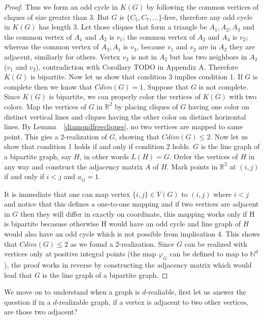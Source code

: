 \documentclass[12pt,a4paper,titlepage,openany]{report}
\begin{document}
\begin{proof}
Thus we form an odd cycle in $K(G)$ by following the common vertices of cliques of size greater than $3$. But $G$ is $\{C_5,C_7,\ldots\}$-free, therefore any odd cycle in $K(G)$ has length $3$. Let those cliques that form a triangle be $A_1,A_2,A_3$ and the common vertex of $A_1$ and $A_2$ is $v_1$; the common vertex of $A_2$ and $A_3$ is $v_2$; whereas the common vertex of $A_3,A_1$ is $v_3$, because $v_1$ and $v_2$ are in $A_2$ they are adjacent, similiarly for others. Vertex $v_3$ is not in $A_2$ but has two neighbors in $A_2$ ($v_1$ and $v_2$), contradiction with Corollary TODO in Appendix A. Therefore $K(G)$ is bipartite.\newline \medskip 
Now let us show that condition 3 implies condition 1. If $G$ is complete then we know that $Cdim(G)=1$. Suppose that $G$ is not complete. Since $K(G)$ is bipartite, we can properly color the vertices of $K(G)$ with two colors. Map the vertices of $G$ in $\mathbb{R}^2$ by placing cliques of $G$ having one color on distinct vertical lines and cliques having the other color on distinct horizontal lines. By Lemma~~\ref{diamondfreecliques}, no two vertices are mapped to same point. This gies a 2-realization of $G$, showing that $Cdim(G)\leq 2$.
\newline
Now let us show that condition 1 holds if and only if condition 2 holds. $G$ is the line graph of a bipartite graph, say $H$, in other words $L(H)=G$. Order the vertices of $H$ in any way and construct the adjacency matrix $A$ of $H$. Mark points in $\mathbb{R}^2$ at $(i, j)$ if and only if $i<j$ and $a_{ij} = 1$. 

It is immediate that one can map vertex $\{i,j\}\in V(G)$ to $(i,j)$ where $i<j$ and notice that this defines a one-to-one mapping and if two vertices are adjacent in $G$ then they will differ in exactly on coordinate, this mapping works only if H is bipartite becasuse otherwise H would have an odd cycle and line graph of $H$ would also have an odd cycle which is not possible from implication 4. This shows that $Cdim(G)\leq 2$ as we found a $2$-realization.\newline
Since $G$ can be realized with vertices only at positive integral points (the map $\varphi_G$ can be defined to map to $\mathbb{N}^d$), the proof works in reverse by constructing the adjacency matrix which would lead that $G$ is the line graph of a bipartite graph.
\end{proof}
We move on to understand when a graph is $d$-realiable, first let us answer the question if in a $d$-realizable graph, if a vertex is adjacent to two other vertices, are those two adjacent?
\end{document}
